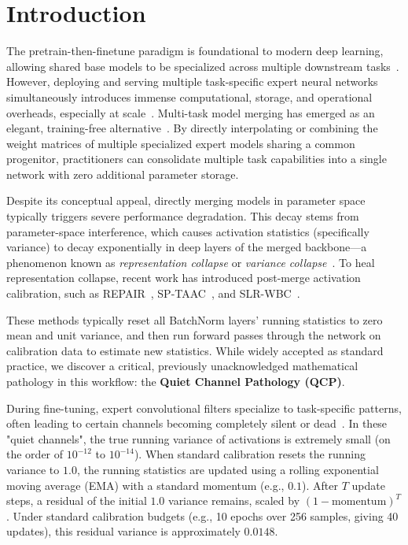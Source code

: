 \documentclass{article}
\begin{document}
\section{Introduction}
\label{sec:intro}

The pretrain-then-finetune paradigm is foundational to modern deep learning, allowing shared base models to be specialized across multiple downstream tasks~\cite{vaswani2017attention, caruana1997multitask, devlin2018bert, radford2019language, dodge2020fine, aghajanyan2021intrinsic}. However, deploying and serving multiple task-specific expert neural networks simultaneously introduces immense computational, storage, and operational overheads, especially at scale~\cite{fedus2022switch, li2022branch, huang2024lorahub}. Multi-task model merging has emerged as an elegant, training-free alternative~\cite{wortsman2022model, ilharco2022editing, choshen2022fusing, jin2022dataless}. By directly interpolating or combining the weight matrices of multiple specialized expert models sharing a common progenitor, practitioners can consolidate multiple task capabilities into a single network with zero additional parameter storage.

Despite its conceptual appeal, directly merging models in parameter space typically triggers severe performance degradation. This decay stems from parameter-space interference, which causes activation statistics (specifically variance) to decay exponentially in deep layers of the merged backbone---a phenomenon known as \textit{representation collapse} or \textit{variance collapse}~\cite{jordan2023repair, stoica2023zipit}. To heal representation collapse, recent work has introduced post-merge activation calibration, such as REPAIR~\cite{jordan2023repair}, SP-TAAC~\cite{anonymous2026b}, and SLR-WBC~\cite{agent2026}.

These methods typically reset all BatchNorm layers' running statistics to zero mean and unit variance, and then run forward passes through the network on calibration data to estimate new statistics. While widely accepted as standard practice, we discover a critical, previously unacknowledged mathematical pathology in this workflow: the \textbf{Quiet Channel Pathology (QCP)}.

During fine-tuning, expert convolutional filters specialize to task-specific patterns, often leading to certain channels becoming completely silent or dead~\cite{glorot2011deep, srinivas2015data, glorot2010understanding, he2015delving}. In these "quiet channels", the true running variance of activations is extremely small (on the order of $10^{-12}$ to $10^{-14}$). When standard calibration resets the running variance to $1.0$, the running statistics are updated using a rolling exponential moving average (EMA) with a standard momentum (e.g., $0.1$). After $T$ update steps, a residual of the initial $1.0$ variance remains, scaled by $(1-\text{momentum})^T$. Under standard calibration budgets (e.g., 10 epochs over 256 samples, giving 40 updates), this residual variance is approximately $0.0148$.
\end{document}
